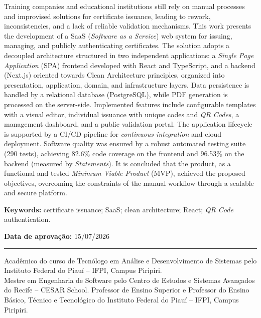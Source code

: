 \documentclass[12pt,openright,oneside,a4paper]{article}
\begin{document}
Training companies and educational institutions still rely on manual processes and improvised solutions for certificate issuance, leading to rework, inconsistencies, and a lack of reliable validation mechanisms. This work presents the development of a SaaS (\textit{Software as a Service}) web system for issuing, managing, and publicly authenticating certificates. The solution adopts a decoupled architecture structured in two independent applications: a \textit{Single Page Application} (SPA) frontend developed with React and TypeScript, and a backend (Next.js) oriented towards Clean Architecture principles, organized into presentation, application, domain, and infrastructure layers. Data persistence is handled by a relational database (PostgreSQL), while PDF generation is processed on the server-side. Implemented features include configurable templates with a visual editor, individual issuance with unique codes and \textit{QR Codes}, a management dashboard, and a public validation portal. The application lifecycle is supported by a CI/CD pipeline for \textit{continuous integration} and cloud deployment. Software quality was ensured by a robust automated testing suite (290 tests), achieving 82.6\% code coverage on the frontend and 96.53\% on the backend (measured by \textit{Statements}). It is concluded that the product, as a functional and tested \textit{Minimum Viable Product} (MVP), achieved the proposed objectives, overcoming the constraints of the manual workflow through a scalable and secure platform.

\noindent\textbf{Keywords:} certificate issuance; SaaS; clean architecture; React; \textit{QR Code} authentication.

\vspace{1cm}

\noindent\textbf{Data de aprovação:} 15/07/2026

\vfill

\noindent\rule{5cm}{0.4pt}

{\small{} Acadêmico do curso de Tecnólogo em Análise e Desenvolvimento de Sistemas pelo Instituto Federal do Piauí -- IFPI, Campus Piripiri.\\
 Mestre em Engenharia de Software pelo Centro de Estudos e Sistemas Avançados do Recife -- CESAR School. Professor de Ensino Superior e Professor do Ensino Básico, Técnico e Tecnológico do Instituto Federal do Piauí -- IFPI, Campus Piripiri.}

\newpage
\thispagestyle{pretextual}
\listoffigures
\end{document}
